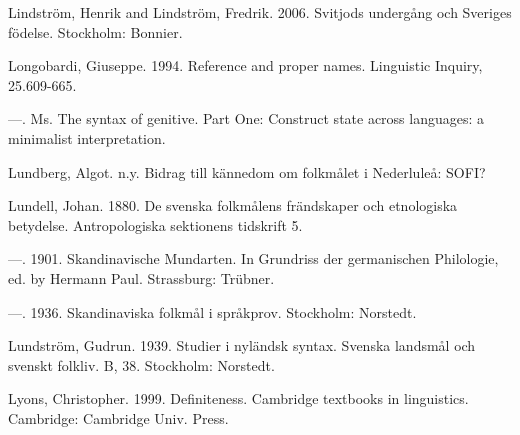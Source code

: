 \begin{styleBodytextC}
Lindström, Henrik and Lindström, Fredrik. 2006. Svitjods undergång och Sveriges födelse. Stockholm: Bonnier.

\end{styleBodytextC}

\begin{styleBodytextC}
Longobardi, Giuseppe. 1994. Reference and proper names. Linguistic Inquiry, 25.609-665.

\end{styleBodytextC}

\begin{styleBodytextC}
—. Ms. The syntax of genitive. Part One: Construct state across languages: a minimalist interpretation.

\end{styleBodytextC}

\begin{styleBodytextC}
Lundberg, Algot. n.y. Bidrag till kännedom om folkmålet i Nederluleå: SOFI?

\end{styleBodytextC}

\begin{styleBodytextC}
Lundell, Johan. 1880. De svenska folkmålens frändskaper och etnologiska betydelse. Antropologiska sektionens tidskrift 5.

\end{styleBodytextC}

\begin{styleBodytextC}
—. 1901. Skandinavische Mundarten. In Grundriss der germanischen Philologie, ed. by Hermann Paul. Strassburg: Trübner.

\end{styleBodytextC}

\begin{styleBodytextC}
—.  1936. Skandinaviska folkmål i språkprov. Stockholm: Norstedt.

\end{styleBodytextC}

\begin{styleBodytextC}
Lundström, Gudrun. 1939. Studier i nyländsk syntax. Svenska landsmål och svenskt folkliv. B, 38. Stockholm: Norstedt.

\end{styleBodytextC}

\begin{styleBodytextC}
Lyons, Christopher. 1999. Definiteness. Cambridge textbooks in linguistics. Cambridge: Cambridge Univ. Press.

\end{styleBodytextC}

